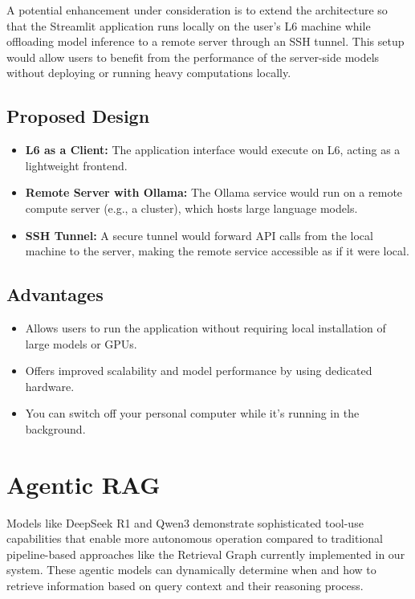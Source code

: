 \documentclass[11pt,a4paper]{report}
\begin{document}
A potential enhancement under consideration is to extend the architecture so that the Streamlit application runs locally on the user's L6 machine while offloading model inference to a remote server through an SSH tunnel. This setup would allow users to benefit from the performance of the server-side models without deploying or running heavy computations locally.

\subsection*{Proposed Design}

\begin{itemize}
    \item \textbf{L6 as a Client:} The application interface would execute on L6, acting as a lightweight frontend.
    \item \textbf{Remote Server with Ollama:} The Ollama service would run on a remote compute server (e.g., a cluster), which hosts large language models.
    \item \textbf{SSH Tunnel:} A secure tunnel would forward API calls from the local machine to the server, making the remote service accessible as if it were local.
\end{itemize}

\subsection*{Advantages}

\begin{itemize}
    \item Allows users to run the application without requiring local installation of large models or GPUs.
    \item Offers improved scalability and model performance by using dedicated hardware.
    \item You can switch off your personal computer while it's running in the background. 
\end{itemize}

\section{Agentic RAG}

Models like DeepSeek R1 and Qwen3 demonstrate sophisticated tool-use capabilities that enable more autonomous operation compared to traditional pipeline-based approaches like the Retrieval Graph currently implemented in our system. These agentic models can dynamically determine when and how to retrieve information based on query context and their reasoning process.
\end{document}
